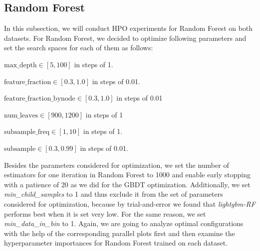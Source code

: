 \subsection{Random Forest}
In this subsection, we will conduct HPO experiments for Random Forest on both datasets. 
For Random Forest, we decided to optimize following parameters and set the search spaces for each of them as follows:
\begin{description}[font=$\bullet$\scshape\bfseries]
	\item $ \text{max\_depth} \in [5, 100] $ in steps of 1.
	\item $ \text{feature\_fraction} \in [0.3, 1.0] $ in steps of 0.01.
	\item $ \text{feature\_fraction\_bynode} \in [0.3, 1.0] $ in steps of 0.01
	\item $ \text{num\_leaves} \in [900, 1200] $ in steps of 1
	\item $ \text{subsample\_freq} \in [1, 10] $ in steps of 1.
	\item $ \text{subsample} \in [0.3, 0.99] $ in steps of 0.01.
\end{description}
Besides the parameters considered for optimization, we set the number of estimators for one iteration in Random Forest to 1000 and enable early stopping with a patience of 20 as we did for the GBDT optimization. Additionally, we set \textit{min\_child\_samples} to 1 and thus exclude it from the set of parameters considered for optimization, because by trial-and-error we found that \textit{lightgbm-RF} performs best when it is set very low. For the same reason, we set \textit{min\_data\_in\_bin} to 1. Again, we are going to analyze optimal configurations with the help of the corresponding parallel plots first and then examine the hyperparameter importances for Random Forest trained on each dataset. 

